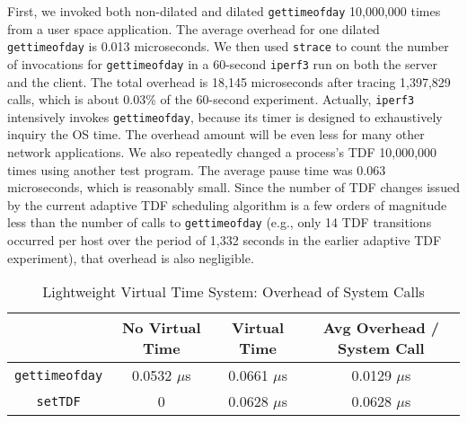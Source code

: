 First, we invoked both non-dilated and dilated \texttt{gettimeofday} 10,000,000 times from a user space application.
The average overhead for one dilated \texttt{gettimeofday} is 0.013 microseconds.
We then used \texttt{strace} to count the number of invocations for \texttt{gettimeofday} in a 60-second \texttt{iperf3} run on both the server and the client.
The total overhead is 18,145 microseconds after tracing 1,397,829 calls, which is about 0.03\% of the 60-second experiment. 
Actually, \texttt{iperf3} intensively invokes \texttt{gettimeofday},
because its timer is designed to exhaustively inquiry the OS time.
The overhead amount will be even less for many other network applications.
We also repeatedly changed a process's TDF 10,000,000 times using another test program.
The average pause time was 0.063 microseconds, which is reasonably small.
Since the number of TDF changes issued by the current adaptive TDF scheduling algorithm
is a few orders of magnitude less than the number of calls to \texttt{gettimeofday}
(e.g., only 14 TDF transitions occurred per host over the period of 1,332 seconds in the earlier adaptive TDF experiment), that overhead is also negligible.

\begin{table*}
    \centering
    \caption{Lightweight Virtual Time System: Overhead of System Calls}
    \begin{tabular}{c|c|c|c}
        \hline
        & No Virtual Time & Virtual Time & Avg Overhead / System Call \\%
        \hline
        \hline
        \texttt{gettimeofday}  & 0.0532 $\mu$s & 0.0661 $\mu$s & 0.0129 $\mu$s\\%
        \hline
        \texttt{setTDF} & 0  & 0.0628 $\mu$s & 0.0628 $\mu$s\\%
        \hline
    \end{tabular}
    \label{VT:Tab:Overhead}
\end{table*}


